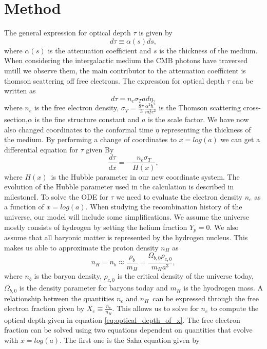 \documentclass[onecolumn]{aastex62}
\begin{document}
\section{Method} \label{sec:method}
The general expression for optical depth $\tau$ is given by
\begin{equation}
    d\tau\equiv\alpha(s)ds,
\end{equation}
where $\alpha(s)$ is the attenuation coefficient and $s$ is the thickness of the medium. When considering the intergalactic medium the CMB photons have traversed untill we observe them, the main contributor to the attenuation coefficient is thomson scattering off free electrons. The expression for optical depth $\tau$ can be written as
\begin{equation}
    d\tau=n_e\sigma_T ad\eta,
\end{equation}
where $n_e$ is the free electron density, $\sigma_T = \frac{8\pi}{3}\frac{\alpha^2\hbar^2}{m_e^2c^2}$ is the Thomson scattering cross-section,$\alpha$ is the fine structure constant and $a$ is the scale factor. We have now also changed coordinates to the conformal time $\eta$ representing the thickness of the medium. By performing a change of coordinates to $x=log(a)$ we can get a differential equation for $\tau$ given By
\begin{equation}\label{eq:optical_depth_of_x}
    \frac{d\tau}{dx} = -\frac{n_e \sigma_T }{H(x)},
\end{equation}
where $H(x)$ is the Hubble parameter in our new coordinate system. The evolution of the Hubble parameter used in the calculation is described in milestoneI. To solve the ODE for $\tau$ we need to evaluate the electron density $n_e$ as a function of $x=log(a)$. When studying the recombination history of the universe, our model will include some simplifications. We assume the universe mostly consists of hydrogen by setting the helium fraction $Y_p=0$. We also assume that all baryonic matter is represented by the hydrogen nucleus. This makes us able to approximate the proton density $n_H$ as
\begin{equation}
    n_H = n_b \approx \frac{\rho_b}{m_H} = \frac{\Omega_{b,0} \rho_{c,0}}{m_H a^3},
\end{equation}
where $n_b$ is the baryon density, $\rho_{c,0}$ is the critical density of the universe today, $\Omega_{b,0}$ is the density parameter for baryons today and $m_H$ is the hyodrogen mass. A relationship between the quantities $n_e$ and $n_H$ can be expressed through the free electron fraction given by $X_e\equiv\frac{n_e}{n_H}$. This allows us to solve for $n_e$ to compute the optical depth given in equation \ref{eq:optical_depth_of_x}. The free electron fraction can be solved using two equations dependent on quantities that evolve with $x=log(a)$. The first one is the Saha equation given by
\end{document}
